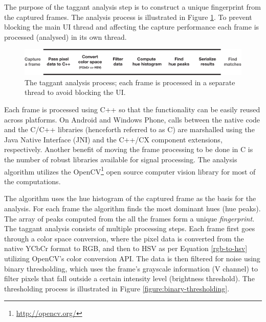 \documentclass[thesis.tex]{subfiles}
\begin{document}
The purpose of the taggant analysis step is to construct a unique fingerprint from the captured frames. The analysis process is illustrated in Figure \ref{figure:taggant-analysis-process}. To prevent blocking the main UI thread and affecting the capture performance each frame is processed (analysed) in its own thread.

\begin{figure}[h]
\centering \includegraphics[width=\textwidth,height=\textheight,keepaspectratio=true]{images/design_implementation/analysis_process.pdf}
\caption{The taggant analysis process; each frame is processed in a separate thread to avoid blocking the UI.\label{figure:taggant-analysis-process}}
\end{figure}

Each frame is processed using C++ so that the functionality can be easily reused across platforms. On Android and Windows Phone, calls between the native code and the C/C++ libraries (henceforth referred to as C) are marshalled using the Java Native Interface (JNI) and the C++/CX component extensions, respectively. Another benefit of moving the frame processing to be done in C is the number of robust libraries available for signal processing. The analysis algorithm utilizes the OpenCV\footnote{\url{http://opencv.org/}} open source computer vision library for most of the computations.

The algorithm uses the hue histogram of the captured frame as the basis for the analysis. For each frame the algorithm finds the most dominant hues (hue peaks). The array of peaks computed from the all the frames form a unique \emph{fingerprint}. The taggant analysis consists of multiple processing steps.
Each frame first goes through a color space conversion, where the pixel data is converted from the native YCbCr format to RGB, and then to HSV as per Equation \ref{rgb-to-hsv} utilizing OpenCV's color conversion API. The data is then filtered for noise using binary thresholding, which uses the frame's grayscale information (V channel) to filter pixels that fall outside a certain intensity level (brightness threshold). The thresholding process is illustrated in Figure \ref{figure:binary-thresholding}.
\end{document}
